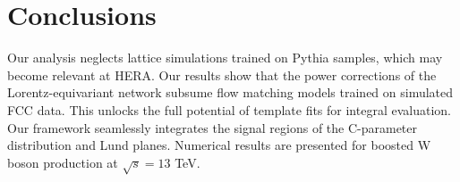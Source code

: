 \section{Conclusions}\label{sec:conclusions}

Our analysis neglects lattice simulations trained on Pythia samples,
which may become relevant at HERA. Our results show that the power
corrections of the Lorentz-equivariant network subsume flow matching
models trained on simulated FCC data. This unlocks the full potential of
template fits for integral evaluation. Our framework seamlessly
integrates the signal regions of the C-parameter distribution and Lund
planes. Numerical results are presented for boosted W boson production
at $\sqrt{s} = 13$ TeV.

